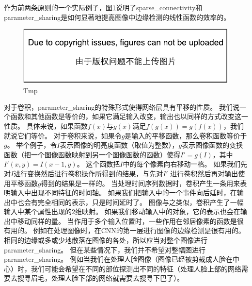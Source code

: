 作为前两条原则的一个实际例子，图\ref{fig:chap9_efficiency_of_edge_detection}说明了\gls{sparse_connectivity}和\gls{parameter_sharing}是如何显著地提高图像中边缘检测的线性函数的效率的。
\begin{figure}
\ifOpenSource
\centerline{\includegraphics{figure.pdf}}
\else
\centering    
{}     
\fi
\caption{Tmp}     
\label{fig:chap9_efficiency_of_edge_detection}     
\end{figure}
 
对于卷积，\gls{parameter_sharing}的特殊形式使得网络层具有平移的性质。
我们说一个函数和其他函数是等价的，如果它满足输入改变，输出也以同样的方式改变这一性质。
具体来说，如果函数$f(x)$与$g(x)$满足$f(g(x))= g(f(x))$，我们就说它们等价。
对于卷积来说，如果令$g$是输入的平移函数，那么卷积函数等价于$g$。
举个例子，令$I$表示图像的明亮度函数（取值为整数），$g$表示图像函数的变换函数（把一个图像函数映射到另一个图像函数的函数）使得$I' = g(I)$，其中$I'(x,y) = I(x-1, y)$。
这个函数把$I$中的每个像素向右移动一格。
如果我们先对$I$进行变换然后进行卷积操作所得到的结果，与先对$I'$ 进行卷积然后再对输出使用平移函数$g$得到的结果是一样的。%
当处理时间序列数据时，卷积产生一条用来表明输入中出现不同特征的时间轴。
如果我们把输入中的一个事件向后延时，在输出中也会有完全相同的表示，只是时间延时了。
图像与之类似，卷积产生了一幅输入中某个属性出现的2维映射。
如果我们移动输入中的对象，它的表示也会在输出中移动同样的量。
当作用于多个输入位置时，一些作用在邻居像素的函数是很有用的。
例如在处理图像时，在\gls{CNN}的第一层进行图像的边缘检测是很有用的。
相同的边缘或多或少地散落在图像的各处，所以应当对整个图像进行\gls{parameter_sharing}。
但在某些情况下，我们并不希望对整幅图进行\gls{parameter_sharing}。
例如当我们在处理人脸图像（图像已经被剪裁成人脸在中心）时，我们可能会希望在不同的部位探测出不同的特征（处理人脸上部的网络需要去搜寻眉毛，处理人脸下部的网络就需要去搜寻下巴了）。

 
